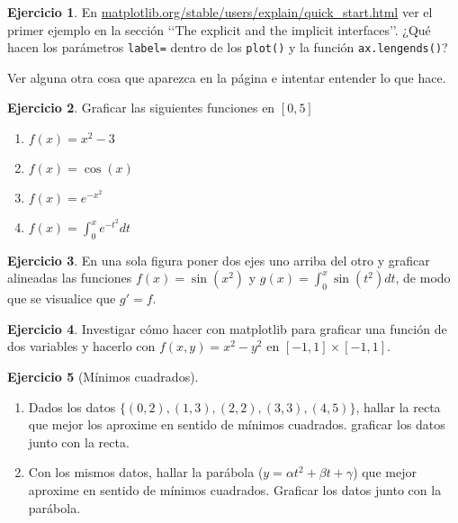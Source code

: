 \documentclass[a4paper,12pt]{book}
\theoremstyle{definition}
\newtheorem{ejercicio}{Ejercicio}
\begin{document}
	\begin{ejercicio}
		En \href{https://matplotlib.org/stable/users/explain/quick_start.html}{matplotlib.org/stable/users/explain/quick\_start.html} ver el primer ejemplo en la sección \lq\lq The explicit and the implicit interfaces\rq\rq. ¿Qué hacen los parámetros {\tt label=} dentro de los {\tt plot()} y la función {\tt ax.lengends()}?
		
		Ver alguna otra cosa que aparezca en la página e intentar entender lo que hace.
	\end{ejercicio}
	
	\begin{ejercicio}
		Graficar las siguientes funciones en $[0,5]$
		\begin{enumerate}
			\item $f(x) = x^2 - 3$
			\item $f(x) = \cos(x)$
			\item $f(x) = e^{-x^2}$
			\item $f(x) = \int_0^xe^{-t^2}dt$
		\end{enumerate}
	\end{ejercicio}
	
	\begin{ejercicio}
		En una sola figura poner dos ejes uno arriba del otro y graficar alineadas las funciones $f(x)=\sin(x^2)$ y $g(x)=\int_0^x\sin(t^2)dt$, de modo que se visualice que $g'=f$. 
	\end{ejercicio}
	
	\begin{ejercicio}
		Investigar cómo hacer con matplotlib para graficar una función de dos variables y hacerlo con $f(x,y) = x^2 - y^2$ en $[-1,1]\times[-1,1]$.
	\end{ejercicio}
	
	\begin{ejercicio}[Mínimos cuadrados]
		\begin{enumerate}
			\item Dados los datos $\{(0,2), (1,3), (2,2), (3,3), (4,5)\}$, hallar la recta que mejor los aproxime en sentido de mínimos cuadrados. graficar los datos junto con la recta.
			
			\item Con los mismos datos, hallar la parábola ($y = \alpha t^2 + \beta t + \gamma$) que mejor aproxime en sentido de mínimos cuadrados. Graficar los datos junto con la parábola.
		\end{enumerate}
	\end{ejercicio}
	
\end{document}
